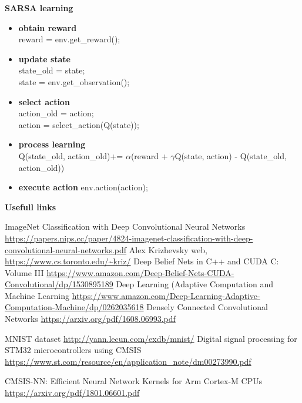 \documentclass[xcolor=dvipsnames]{beamer}
\begin{document}
\begin{frame}{\bf SARSA learning}

\begin{itemize}
  \item {\color{red} \bf obtain reward} \\
        reward = env.get\_reward();

  \item {\color{red} \bf update state} \\
        state\_old = state; \\
        state = env.get\_observation(); \\

  \item {\color{red} \bf select action} \\
        action\_old = action; \\
        action = select\_action(Q(state)); \\

  \item {\color{red} \bf process learning} \\
    Q(state\_old, action\_old)+= $\alpha$(reward + $\gamma$Q(state, action) - Q(state\_old, action\_old))

  \item {\color{red} \bf execute action}
    env.action(action);

\end{itemize}


\end{frame}








\begin{frame}{\bf Usefull links}

{\tiny
  \begin{thebibliography}{9}
    \bibitem {}ImageNet Classification with Deep Convolutional Neural Networks \url{https://papers.nips.cc/paper/4824-imagenet-classification-with-deep-convolutional-neural-networks.pdf}
    \bibitem {}Alex Krizhevsky web, \url{https://www.cs.toronto.edu/~kriz/}
    \bibitem {}Deep Belief Nets in C++ and CUDA C: Volume III \url{https://www.amazon.com/Deep-Belief-Nets-CUDA-Convolutional/dp/1530895189}
    \bibitem {}Deep Learning (Adaptive Computation and Machine Learning \url{https://www.amazon.com/Deep-Learning-Adaptive-Computation-Machine/dp/0262035618}
    \bibitem {}Densely Connected Convolutional Networks \url{https://arxiv.org/pdf/1608.06993.pdf}

    \bibitem {}MNIST dataset \url{http://yann.lecun.com/exdb/mnist/}
    \bibitem {}Digital signal processing for STM32 microcontrollers using CMSIS \url{https://www.st.com/resource/en/application_note/dm00273990.pdf}

    \bibitem {}CMSIS-NN: Efficient Neural Network Kernels for Arm Cortex-M CPUs \url{https://arxiv.org/pdf/1801.06601.pdf}

  \end{thebibliography}
}

\end{frame}
\end{document}
